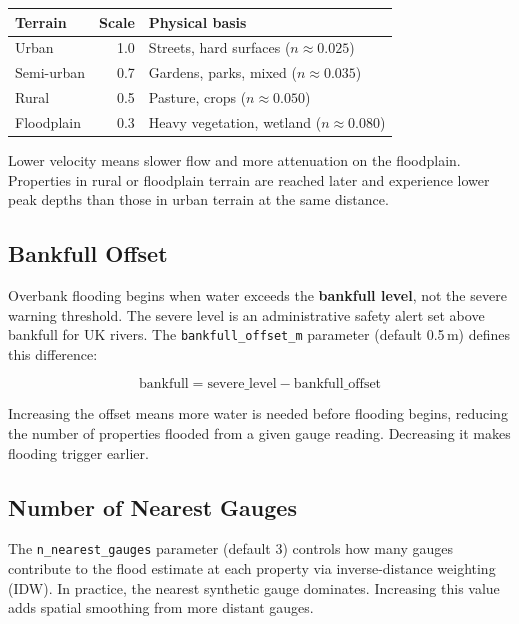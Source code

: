 \documentclass[11pt,a4paper]{article}
\begin{document}
\begin{center}
\begin{tabular}{lrl}
\toprule
\textbf{Terrain} & \textbf{Scale} & \textbf{Physical basis} \\
\midrule
Urban      & 1.0 & Streets, hard surfaces ($n \approx 0.025$) \\
Semi-urban & 0.7 & Gardens, parks, mixed ($n \approx 0.035$) \\
Rural      & 0.5 & Pasture, crops ($n \approx 0.050$) \\
Floodplain & 0.3 & Heavy vegetation, wetland ($n \approx 0.080$) \\
\bottomrule
\end{tabular}
\end{center}

\noindent Lower velocity means slower flow and more attenuation on the
floodplain.  Properties in rural or floodplain terrain are reached later
and experience lower peak depths than those in urban terrain at the same
distance.

\subsection{Bankfull Offset}

Overbank flooding begins when water exceeds the \textbf{bankfull level},
not the severe warning threshold.  The severe level is an administrative
safety alert set above bankfull for UK rivers.  The
\texttt{bankfull\_offset\_m} parameter (default 0.5\,m) defines this
difference:

\[
  \text{bankfull} = \text{severe\_level} - \text{bankfull\_offset}
\]

\noindent Increasing the offset means more water is needed before
flooding begins, reducing the number of properties flooded from a given
gauge reading.  Decreasing it makes flooding trigger earlier.

\subsection{Number of Nearest Gauges}

The \texttt{n\_nearest\_gauges} parameter (default 3) controls how many
gauges contribute to the flood estimate at each property via
inverse-distance weighting (IDW).  In practice, the nearest synthetic
gauge dominates.  Increasing this value adds spatial smoothing from
more distant gauges.
\end{document}
